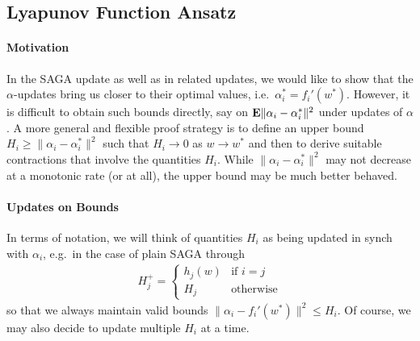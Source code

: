 \documentclass{article}
\newcommand{\E}{{\bf E}}
\begin{document}
\subsection{Lyapunov Function Ansatz} 

\paragraph{Motivation}
In the SAGA update as well as in related updates, we would like to show that the $\alpha$-updates bring us closer to their optimal values, i.e.~$\alpha_i^* = f_i'(w^*)$. However, it is difficult to obtain such bounds directly, say on $\E \| \alpha_i - \alpha_i^*\|^2$ under updates of $\alpha$. A more general and flexible proof strategy is to define an upper bound $H_i \geq \| \alpha_i - \alpha_i^*\|^2$ such that $H_i \to 0$ as $w \to w^*$ and then to derive suitable contractions that involve the quantities $H_i$. While $\| \alpha_i - \alpha_i^*\|^2$ may not decrease at a monotonic rate (or at all), the upper bound may be much better behaved.

\paragraph{Updates on Bounds}
In terms of notation, we will think of quantities $H_i$ as being updated in synch with $\alpha_i$, e.g.~in the case of plain SAGA through
\begin{align}
H_j^+ = 
\begin{cases}
h_j(w) & \text{if $i=j$} \\
H_j & \text{otherwise}
\end{cases} 
\label{eq:recurrence-h}
\end{align} 
so that we always maintain valid bounds $\| \alpha_i - f_i'(w^*) \|^2 \le H_i$. Of course, we may also decide to update multiple $H_i$ at a time.
\end{document}
